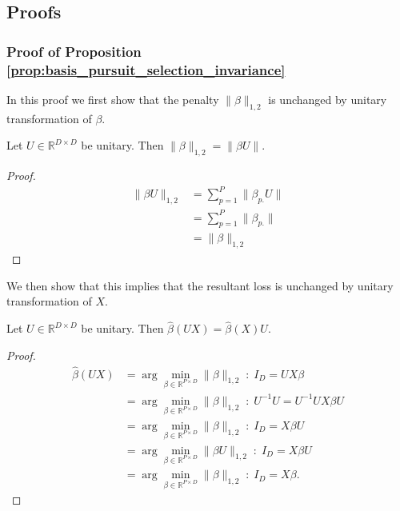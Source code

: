 \subsection{Proofs}
\label{sec:proofs}

\subsubsection{Proof of Proposition \ref{prop:basis_pursuit_selection_invariance}}
\label{proof:basis_pursuit_program_invariance}

In this proof we first show that the penalty $\|\beta\|_{1,2}$ is unchanged by unitary transformation of $\beta$.

 \begin{proposition}
 \label{prop:basis_pursuit_loss_equivalence}
 Let $U \in \mathbb R^{D \times D}$ be unitary.
 Then $\|\beta\|_{1,2} = \|\beta U \|$.
\end{proposition}

\begin{proof}
\begin{align}
\|\beta U \|_{1,2} &= \sum_{p = 1}^P \| \beta_{p.} U \| \\
&= \sum_{p = 1}^P \| \beta_{p.} \| \\
&= \|\beta \|_{1,2}
\end{align}
\end{proof}

We then show that this implies that the resultant loss is unchanged by unitary transformation of $ X$.

\begin{proposition}
 \label{prop:basis_pursuit_loss_equivalence}
 Let $U \in \mathbb R^{D \times D}$ be unitary.
 Then $\widehat \beta  (U  X) = \widehat \beta  (  X) U$.
\end{proposition}

\begin{proof}
\begin{align}
\widehat \beta  (U  X)  &= \arg \min_{\beta \in \mathbb R^{P \times D}} \|\beta\|_{1,2}  \; : \; I_{D} = U X \beta \\
&= \arg \min_{\beta \in \mathbb R^{P \times D}} \|\beta\|_{1,2}  \; : \; U^{-1} U = U^{-1} U X \beta U \\
&= \arg \min_{\beta \in \mathbb R^{P \times D}} \|\beta\|_{1,2}  \; : \;  I_D = X \beta U \\
&= \arg \min_{\beta \in \mathbb R^{P \times D}} \|\beta U \|_{1,2}  \; : \;  I_D = X \beta U \\
&= \arg \min_{\beta \in \mathbb R^{P \times D}} \|\beta \|_{1,2}  \; : \;  I_D = X \beta.
\end{align}
\end{proof}

